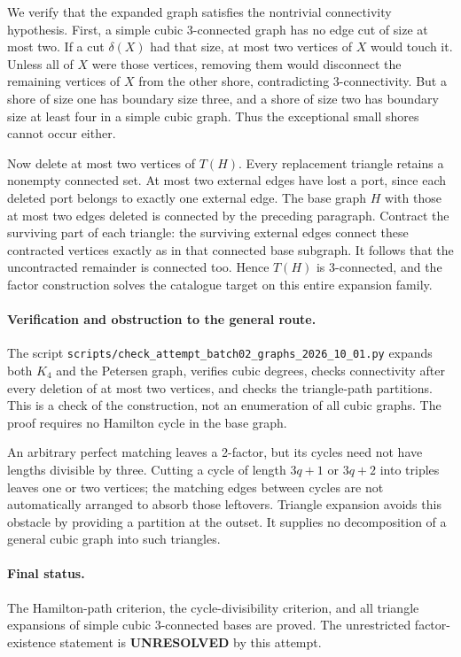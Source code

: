 \documentclass[11pt,a4paper]{article}
\begin{document}
We verify that the expanded graph satisfies the nontrivial connectivity hypothesis. First, a simple cubic 3-connected graph has no edge cut of size at most two. If a cut $\delta(X)$ had that size, at most two vertices of $X$ would touch it. Unless all of $X$ were those vertices, removing them would disconnect the remaining vertices of $X$ from the other shore, contradicting 3-connectivity. But a shore of size one has boundary size three, and a shore of size two has boundary size at least four in a simple cubic graph. Thus the exceptional small shores cannot occur either.

Now delete at most two vertices of $T(H)$. Every replacement triangle retains a nonempty connected set. At most two external edges have lost a port, since each deleted port belongs to exactly one external edge. The base graph $H$ with those at most two edges deleted is connected by the preceding paragraph. Contract the surviving part of each triangle: the surviving external edges connect these contracted vertices exactly as in that connected base subgraph. It follows that the uncontracted remainder is connected too. Hence $T(H)$ is 3-connected, and the factor construction solves the catalogue target on this entire expansion family.

\paragraph{Verification and obstruction to the general route.}
The script \texttt{scripts/check\_attempt\_batch02\_graphs\_2026\_10\_01.py} expands both $K_4$ and the Petersen graph, verifies cubic degrees, checks connectivity after every deletion of at most two vertices, and checks the triangle-path partitions. This is a check of the construction, not an enumeration of all cubic graphs. The proof requires no Hamilton cycle in the base graph.

An arbitrary perfect matching leaves a 2-factor, but its cycles need not have lengths divisible by three. Cutting a cycle of length $3q+1$ or $3q+2$ into triples leaves one or two vertices; the matching edges between cycles are not automatically arranged to absorb those leftovers. Triangle expansion avoids this obstacle by providing a partition at the outset. It supplies no decomposition of a general cubic graph into such triangles.

\paragraph{Final status.}
The Hamilton-path criterion, the cycle-divisibility criterion, and all triangle expansions of simple cubic 3-connected bases are proved. The unrestricted factor-existence statement is \textbf{UNRESOLVED} by this attempt.
\end{document}
